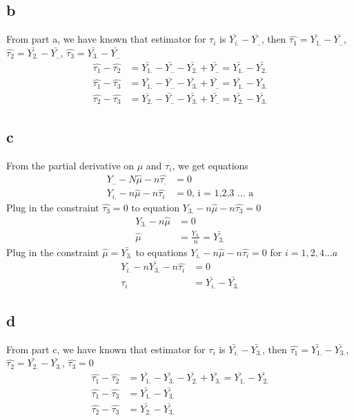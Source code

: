 \documentclass[11pt,letterpaper]{article}
\begin{document}
\subsection*{b}
\noindent From part a, we have known that estimator for $\tau_i$ is $\bar{Y_{i.}} - \bar{Y_{..}}$, then $\hat{\tau_1} = \bar{Y_{1.}} - \bar{Y_{..}}$, $\hat{\tau_2} = \bar{Y_{2.}} - \bar{Y_{..}}$, $\hat{\tau_3} = \bar{Y_{3.}} - \bar{Y_{..}}$
\begin{align*}
\hat{\tau_1} - \hat{\tau_2} &= \bar{Y_{1.}} - \bar{Y_{..}} - \bar{Y_{2.}} + \bar{Y_{..}} = \bar{Y_{1.}} - \bar{Y_{2.}} \\
\hat{\tau_1} - \hat{\tau_3} &= \bar{Y_{1.}} - \bar{Y_{..}} - \bar{Y_{3.}} + \bar{Y_{..}} = \bar{Y_{1.}} - \bar{Y_{3.}} \\
\hat{\tau_2} - \hat{\tau_3} &= \bar{Y_{2.}} - \bar{Y_{..}} - \bar{Y_{3.}} + \bar{Y_{..}} = \bar{Y_{2.}} - \bar{Y_{3.}} 
\end{align*}

\subsection*{c}
\noindent From the partial derivative on $\mu$ and $\tau_i$, we get equations 
\begin{align*}
Y_{..} - N \hat{\mu} - n\hat{\tau_.} &= 0 \\
Y_{i.} - n \hat{\mu} - n\hat{\tau_i} &= 0 \text{, i = 1,2,3 ... a}
\end{align*}
Plug in the constraint $\hat{\tau_3} = 0$ to equation $Y_{3.} - n \hat{\mu} - n\hat{\tau_3} = 0$
\begin{align*}
Y_{3.} - n \hat{\mu} &= 0 \\
\hat{\mu} &= \frac{Y_{3.}}{n} = \bar{Y_{3.}}
\end{align*}
Plug in the constraint $\hat{\mu} = \bar{Y_{3.}}$ to equations $Y_{i.} - n \hat{\mu} - n\hat{\tau_i} = 0$ for $i = 1,2,4... a$
\begin{align*}
Y_{i.} - n\bar{Y_{3.}} - n \hat{\tau_i} &= 0 \\
\tau_i &= \bar{Y_{i.}} - \bar{Y_{3.}}
\end{align*}

\subsection*{d}
\noindent From part c, we have known that estimator for $\tau_i$ is $\bar{Y_{i.}} - \bar{Y_{3.}}$, then $\hat{\tau_1} = \bar{Y_{1.}} - \bar{Y_{3.}}$, $\hat{\tau_2} = \bar{Y_{2.}} - \bar{Y_{3.}}$, $\hat{\tau_3} = 0$
\begin{align*}
\hat{\tau_1} - \hat{\tau_2} &= \bar{Y_{1.}} - \bar{Y_{3.}} - \bar{Y_{2.}} + \bar{Y_{3.}} = \bar{Y_{1.}} - \bar{Y_{2.}} \\
\hat{\tau_1} - \hat{\tau_3} &= \bar{Y_{1.}} - \bar{Y_{3.}} \\
\hat{\tau_2} - \hat{\tau_3} &= \bar{Y_{2.}} - \bar{Y_{3.}} 
\end{align*}
\end{document}
